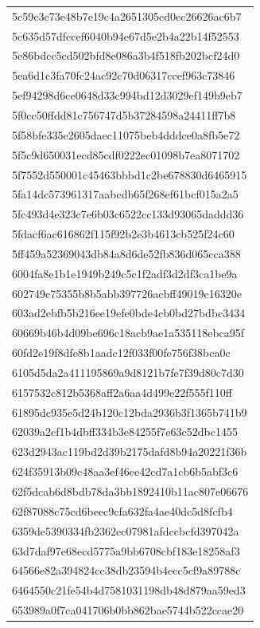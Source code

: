 \begin{tabular}{l}
5c59c3c73e48b7e19c4a2651305cd0ec26626ac6b7 \\
5c635d57dfccef6040b94e67d5e2b4a22b14f52553 \\
5e86bdcc5cd502bfd8e086a3b4f518fb202bcf24d0 \\
5ea6d1c3fa70fc24ac92c70d06317ccef963c73846 \\
5ef94298d6ce0648d33c994bd12d3029ef149b9eb7 \\
5f0cc50ffdd81c756747d5b37284598a24411ff7b8 \\
5f58bfe335e2605daec11075beb4dddce0a8fb5e72 \\
5f5c9d650031ecd85cdf0222ec01098b7ea8071702 \\
5f7552d550001c45463bbbd1c2be678830d6465915 \\
5fa14dc573961317aabcdb65f268ef61bcf015a2a5 \\
5fc493d4e323c7e6b03c6522cc133d93065daddd36 \\
5fdacf6ac616862f115f92b2e3b4613cb525f24c60 \\
5ff459a52369043db84a8d6de52fb836d065cca388 \\
6004fa8e1b1e1949b249c5c1f2adf3d2df3ca1be9a \\
602749c75355b8b5abb397726acbff49019c16320e \\
603ad2ebfb5b216ee19efe0bde4cb0bd27bdbc3434 \\
60669b46b4d09be696c18acb9ae1a535118ebca95f \\
60fd2e19f8dfe8b1aadc12f033f00fe756f38bca0c \\
6105d5da2a411195869a9d8121b7fe7f39d80c7d30 \\
6157532c812b5368aff2a6aa4d499e22f555f110ff \\
61895dc935e5d24b120c12bda2936b3f1365b741b9 \\
62039a2cf1b4dbff334b3e84255f7e63c52dbc1455 \\
623d2943ac119bd2d39b2175dafd8b94a20221f36b \\
624f35913b09c48aa3ef46ee42cd7a1cb6b5abf3c6 \\
62f5dcab6d8bdb78da3bb1892410b11ac807e06676 \\
62f87088c75cd6beec9cfa632fa4ae40dc5d8fcfb4 \\
6359de5390334fb2362ec07981afdccbcfd397042a \\
63d7daf97e68ecd5775a9bb6708cbf183e18258af3 \\
64566e82a394824cc38db23594b4ecc5cf9a89788c \\
6464550c21fe54b4d7581031198db48d879aa59ed3 \\
653989a0f7ca041706b0bb862bae5744b522ccae20 \\

\end{tabular}
